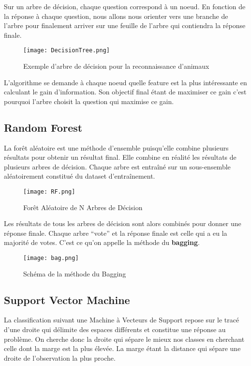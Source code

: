 \documentclass[a4paper,french,12pt]{article}
\begin{document}
Sur un arbre de décision, chaque question correspond à un noeud. En fonction de la réponse à chaque question, nous allons nous orienter vers une branche de l’arbre pour finalement arriver sur une feuille de l’arbre qui contiendra la réponse finale.

\begin{figure}[!h]
    \centering
    \texttt{[image: DecisionTree.png]}
    \caption{Exemple d'arbre de décision pour la reconnaissance d'animaux}
\end{figure}

L'algorithme se demande à chaque noeud quelle feature est la plus intéressante en calculant le gain d'information. Son objectif final étant de maximiser ce gain c’est pourquoi l’arbre choisit la question qui maximise ce gain.

\subsection{Random Forest}

La forêt aléatoire est une méthode d’ensemble puisqu'elle combine plusieurs résultats pour obtenir un résultat final. Elle combine en réalité les résultats de plusieurs arbres de décision. Chaque arbre est entraîné sur un sous-ensemble aléatoirement constitué du dataset d'entraînement.\\

\begin{figure}[!h]
    \centering
    \texttt{[image: RF.png]}
    \caption{Forêt Aléatoire de N Arbres de Décision}
\end{figure}

Les résultats de tous les arbres de décision sont alors combinés pour donner une réponse finale. Chaque arbre “vote” et la réponse finale est celle qui a eu la majorité de votes. C'est ce qu'on appelle la méthode du \textbf{bagging}.\\

\begin{figure}[!h]
    \centering
    \texttt{[image: bag.png]}
    \caption{Schéma de la méthode du Bagging}
\end{figure}

\subsection{Support Vector Machine}

La classification suivant une Machine à Vecteurs de Support repose sur le tracé d'une droite qui délimite des espaces différents et constitue une réponse au problème. On cherche donc la droite qui sépare le mieux nos classes en cherchant celle dont la marge est la plus élevée. La marge étant la distance qui sépare une droite de l’observation la plus proche.\\
\end{document}
